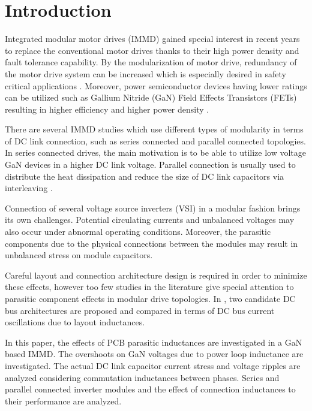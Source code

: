 \section{Introduction}\label{sec:Intro}
Integrated modular motor drives (IMMD) gained special interest in recent years to replace the conventional motor drives thanks to their high power density and fault tolerance capability. By the modularization of motor drive, redundancy of the motor drive system can be increased which is especially desired in safety critical applications \cite{Zhang2017}. Moreover, power semiconductor devices having lower ratings can be utilized such as Gallium Nitride (GaN) Field Effects Transistors (FETs) resulting in higher efficiency and higher power density \cite{Wang2015b}.

There are several IMMD studies which use different types of modularity in terms of DC link connection, such as series connected \cite{Wang2015b} and parallel connected \cite{Zhang2017} topologies. In series connected drives, the main motivation is to be able to utilize low voltage GaN devices in a higher DC link voltage. Parallel connection is usually used to distribute the heat dissipation and reduce the size of DC link capacitors via interleaving \cite{Ugur2017}.

Connection of several voltage source inverters (VSI) in a modular fashion brings its own challenges. Potential circulating currents and unbalanced voltages may also occur under abnormal operating conditions. Moreover, the parasitic components due to the physical connections between the modules may result in unbalanced stress on module capacitors.

Careful layout and connection architecture design is required in order to minimize these effects, however too few studies in the literature give special attention to parasitic component effects in modular drive topologies. In \cite{Brown2007}, two candidate DC bus architectures are proposed and compared in terms of DC bus current oscillations due to layout inductances.

In this paper, the effects of PCB parasitic inductances are investigated in a GaN based IMMD. The overshoots on GaN voltages due to power loop inductance are investigated. The actual DC link capacitor current stress and voltage ripples are analyzed considering commutation inductances between phases. Series and parallel connected inverter modules and the effect of connection inductances to their performance are analyzed.

